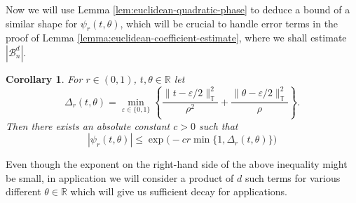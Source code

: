 \documentclass{article}
\newcommand{\R}{\mathbb R}
\newcommand{\T}{\mathbb T}
\theoremstyle{plain}
\newtheorem{corollary}[theorem]{Corollary}
\numberwithin{equation}{section}
\begin{document}
Now we will use Lemma \ref{lem:euclidean-quadratic-phase} to deduce a bound of a similar shape for $\psi_r(t,\theta)$, which will be crucial to handle error terms in the proof of Lemma \ref{lemma:euclidean-coefficient-estimate}, where we shall estimate $|\mathcal{B}_n^d|$.
\begin{corollary} \label{corollary: psi decay}
 For $r \in (0,1)$, $t,\theta \in \R$ let 
 \[
 \Delta_r(t,\theta)= \min_{\varepsilon \in \{0,1 \}} \left\{ \frac{\|t-\varepsilon/2\|_{\T}^2}{\rho^2}+ \frac{\| \theta-\varepsilon/2 \|_{\T}^2}{\rho} \right\}.
 \]
 Then there exists an absolute constant $c>0$ such that 
 \[
 |\psi_r(t,\theta)| \le \exp\big(-cr \min\{1,\Delta_{r}(t,\theta)\}\big)
 \]
\end{corollary}
Even though the exponent on the right-hand side of the above inequality might be small, in application we will consider a product of $d$ such terms for various different $\theta \in \R$ which will give us sufficient decay for applications.
\end{document}
